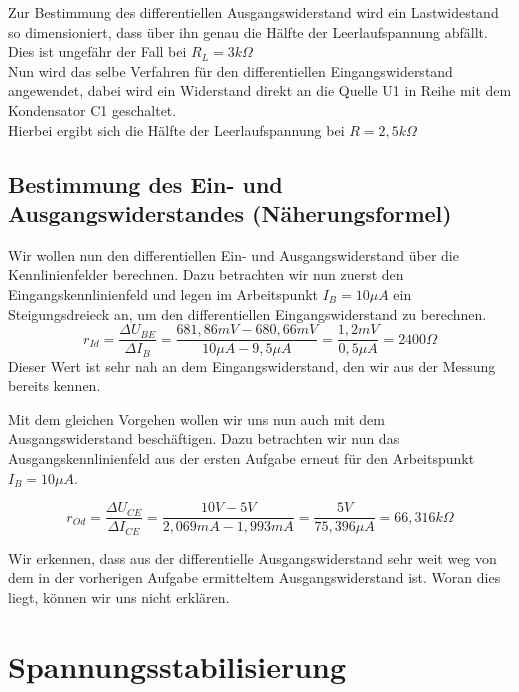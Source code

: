 \documentclass{article}
\begin{document}
Zur Bestimmung des differentiellen Ausgangswiderstand wird ein Lastwidestand so dimensioniert, dass über ihn genau die Hälfte der Leerlaufspannung abfällt.
\\ Dies ist ungefähr der Fall bei $R_L = 3k\Omega$\\
Nun wird das selbe Verfahren für den differentiellen Eingangswiderstand angewendet, dabei wird ein Widerstand direkt an die Quelle U1 in Reihe mit dem Kondensator C1 geschaltet.
\\ Hierbei ergibt sich die Hälfte der Leerlaufspannung bei $R = 2,5k\Omega$


\subsection{Bestimmung des Ein- und Ausgangswiderstandes (Näherungsformel)}
\label{sec:bestimmung-des-ein}

Wir wollen nun den differentiellen Ein- und Ausgangswiderstand über die Kennlinienfelder berechnen. Dazu betrachten wir nun zuerst den Eingangskennlinienfeld und legen im Arbeitspunkt $I_{B} = 10\mu A$ ein Steigungsdreieck an, um den differentiellen Eingangswiderstand zu berechnen.
\begin{equation*}
  r_{Id} = \frac{\Delta U_{BE}}{\Delta I_{B}} = \frac{681,86mV - 680,66mV}{10\mu A - 9,5\mu A} = \frac{1,2mV}{0,5\mu A} = 2400\Omega
\end{equation*}
Dieser Wert ist sehr nah an dem Eingangswiderstand, den wir aus der Messung bereits kennen.

Mit dem gleichen Vorgehen wollen wir uns nun auch mit dem Ausgangswiderstand beschäftigen. Dazu betrachten wir nun das Ausgangskennlinienfeld aus der ersten Aufgabe erneut für den Arbeitspunkt $I_{B} = 10\mu A$.

\begin{equation*}
  r_{Od} = \frac{\Delta U_{CE}}{\Delta I_{CE}} = \frac{10V - 5V}{2,069mA - 1,993mA} = \frac{5V}{75,396\mu A} = 66,316k\Omega
\end{equation*}

Wir erkennen, dass aus der differentielle Ausgangswiderstand sehr weit weg von dem in der vorherigen Aufgabe ermitteltem Ausgangswiderstand ist. Woran dies liegt, können wir uns nicht erklären.
\newpage

\section{Spannungsstabilisierung}
\end{document}
